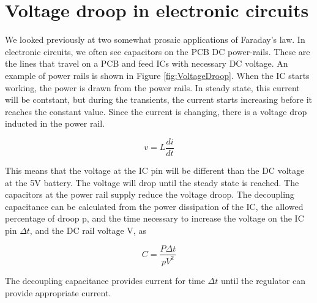 \documentclass{ximera}
\begin{document}
\section{Voltage droop in electronic circuits}


We looked previously at two somewhat prosaic applications of Faraday's law. In electronic circuits, we often see capacitors on the PCB DC power-rails. These are the lines that travel on a PCB and feed ICs with necessary DC voltage. An example of power rails is shown in Figure \ref{fig:VoltageDroop}. When the IC starts working, the power is drawn from the power rails. In steady state, this current will be contstant, but during the transients, the current starts increasing before it reaches the constant value. Since the current is changing, there is a voltage drop inducted in the power rail. 

\begin{equation}
v=L \frac{di}{dt}
\end{equation}

This means that the voltage at the IC pin will be different than the DC voltage at the 5V battery. The voltage will drop until the steady state is reached. The capacitors at the power rail supply reduce the voltage droop. The decoupling capacitance can be calculated from the power dissipation of the IC, the allowed percentage of droop p, and the time necessary to increase the voltage on the IC pin $\Delta t$, and the DC rail voltage V, as

\begin{equation}
C=\frac{P \Delta t}{p V^2} 
\end{equation}

The decoupling capacitance provides current for time $\Delta t$ until the regulator can provide appropriate current.
\end{document}
